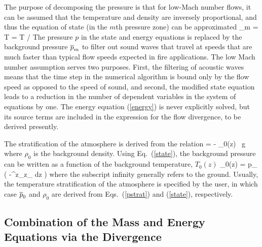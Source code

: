 \documentclass[11pt]{book}
\begin{document}
The purpose of decomposing the pressure is that for low-Mach number flows, it can be assumed that the temperature and density are inversely
proportional, and thus the equation of state (in the $m$th pressure zone) can be approximated
\be \bp_m  =  \rho T \R \sumyw = \rho T \R / \bW  \label{state} \ee
The pressure $p$ in the state and energy equations is replaced by the background pressure $\overline{p}_m$ to filter out sound waves
that travel at speeds that are much faster
than typical flow speeds expected in fire applications. The low Mach number assumption serves two purposes. First, the filtering of acoustic waves
means that the time step in the numerical algorithm is bound only by the flow speed as opposed to the speed of sound, and second, the modified state
equation leads to a reduction in the number of dependent variables in the system of equations by one. The energy equation (\ref{energy}) is never
explicitly solved, but its source terms are included in the expression for the flow divergence, to be derived presently.

The stratification of the atmosphere is derived from the relation
\be {} = - \rho_0(z) \, g  \ee
where $\rho_0$ is the background
density. Using Eq.~(\ref{state}), the background pressure can be written as a function of the background temperature, $T_0(z)$
\be \bp_0(z) = p_\infty \; \exp \; \left( -\int^z_{z_\infty}  dz \right)  \label{pstrat} \ee
where the subscript infinity generally refers to the ground. Usually, the temperature stratification of the atmosphere is
specified by the user, in which case $\overline{p}_0$ and $\rho_0$ are derived from Eqs.~(\ref{pstrat}) and (\ref{state}), respectively.


\subsection{Combination of the Mass and Energy Equations via the Divergence}
\end{document}
